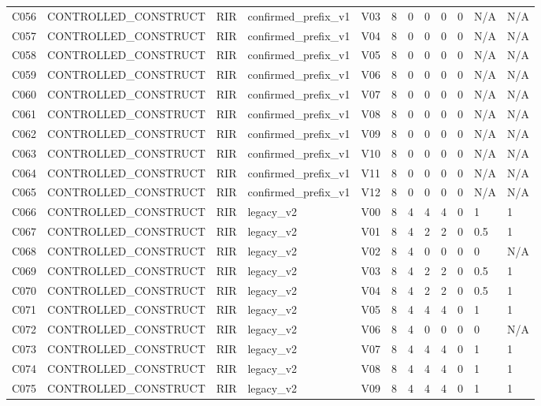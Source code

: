 \begin{longtable}{llllllllllll}
C056 & CONTROLLED\_CONSTRUCT & RIR & confirmed\_prefix\_v1 & V03 & 8 & 0 & 0 & 0 & 0 & N/A & N/A \\
C057 & CONTROLLED\_CONSTRUCT & RIR & confirmed\_prefix\_v1 & V04 & 8 & 0 & 0 & 0 & 0 & N/A & N/A \\
C058 & CONTROLLED\_CONSTRUCT & RIR & confirmed\_prefix\_v1 & V05 & 8 & 0 & 0 & 0 & 0 & N/A & N/A \\
C059 & CONTROLLED\_CONSTRUCT & RIR & confirmed\_prefix\_v1 & V06 & 8 & 0 & 0 & 0 & 0 & N/A & N/A \\
C060 & CONTROLLED\_CONSTRUCT & RIR & confirmed\_prefix\_v1 & V07 & 8 & 0 & 0 & 0 & 0 & N/A & N/A \\
C061 & CONTROLLED\_CONSTRUCT & RIR & confirmed\_prefix\_v1 & V08 & 8 & 0 & 0 & 0 & 0 & N/A & N/A \\
C062 & CONTROLLED\_CONSTRUCT & RIR & confirmed\_prefix\_v1 & V09 & 8 & 0 & 0 & 0 & 0 & N/A & N/A \\
C063 & CONTROLLED\_CONSTRUCT & RIR & confirmed\_prefix\_v1 & V10 & 8 & 0 & 0 & 0 & 0 & N/A & N/A \\
C064 & CONTROLLED\_CONSTRUCT & RIR & confirmed\_prefix\_v1 & V11 & 8 & 0 & 0 & 0 & 0 & N/A & N/A \\
C065 & CONTROLLED\_CONSTRUCT & RIR & confirmed\_prefix\_v1 & V12 & 8 & 0 & 0 & 0 & 0 & N/A & N/A \\
C066 & CONTROLLED\_CONSTRUCT & RIR & legacy\_v2 & V00 & 8 & 4 & 4 & 4 & 0 & 1 & 1 \\
C067 & CONTROLLED\_CONSTRUCT & RIR & legacy\_v2 & V01 & 8 & 4 & 2 & 2 & 0 & 0.5 & 1 \\
C068 & CONTROLLED\_CONSTRUCT & RIR & legacy\_v2 & V02 & 8 & 4 & 0 & 0 & 0 & 0 & N/A \\
C069 & CONTROLLED\_CONSTRUCT & RIR & legacy\_v2 & V03 & 8 & 4 & 2 & 2 & 0 & 0.5 & 1 \\
C070 & CONTROLLED\_CONSTRUCT & RIR & legacy\_v2 & V04 & 8 & 4 & 2 & 2 & 0 & 0.5 & 1 \\
C071 & CONTROLLED\_CONSTRUCT & RIR & legacy\_v2 & V05 & 8 & 4 & 4 & 4 & 0 & 1 & 1 \\
C072 & CONTROLLED\_CONSTRUCT & RIR & legacy\_v2 & V06 & 8 & 4 & 0 & 0 & 0 & 0 & N/A \\
C073 & CONTROLLED\_CONSTRUCT & RIR & legacy\_v2 & V07 & 8 & 4 & 4 & 4 & 0 & 1 & 1 \\
C074 & CONTROLLED\_CONSTRUCT & RIR & legacy\_v2 & V08 & 8 & 4 & 4 & 4 & 0 & 1 & 1 \\
C075 & CONTROLLED\_CONSTRUCT & RIR & legacy\_v2 & V09 & 8 & 4 & 4 & 4 & 0 & 1 & 1 \\

\end{longtable}
